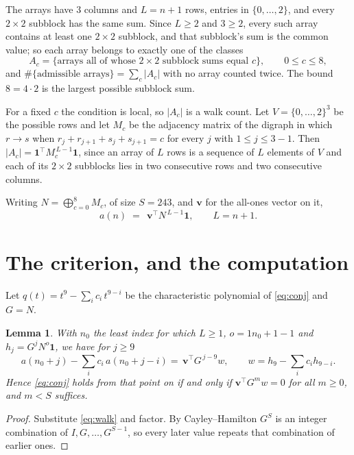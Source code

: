 \documentclass[11pt,a4paper]{article}
\theoremstyle{plain}
\newtheorem{lemma}[theorem]{Lemma}
\theoremstyle{definition}
\begin{document}
The arrays have $3$ columns and $L=n+1$ rows, entries in
$\{0,\dots,2\}$, and every $2\times2$ subblock has the same sum. Since $L\ge2$ and
$3\ge2$, every such array contains at least one $2\times2$ subblock, and that subblock's
sum is the common value; so each array belongs to exactly one of the classes
\[
A_c=\{\text{arrays all of whose }2\times2\text{ subblock sums equal }c\},
\qquad 0\le c\le 8,
\]
and $\#\{\text{admissible arrays}\}=\sum_c |A_c|$ with no array counted twice. The bound
$8=4\cdot2$ is the largest possible subblock sum.

For a fixed $c$ the condition is local, so $|A_c|$ is a walk count. Let
$V=\{0,\dots,2\}^{3}$ be the possible rows and let $M_c$ be the adjacency
matrix of the digraph in which $r\to s$ when
$r_j+r_{j+1}+s_j+s_{j+1}=c$ for every $j$ with $1\le j\le 3-1$. Then
$|A_c|=\mathbf{1}^{\!\top}M_c^{\,L-1}\mathbf{1}$, since an array of $L$ rows is a
sequence of $L$ elements of $V$ and each of its $2\times2$ subblocks lies in two consecutive
rows and two consecutive columns.

Writing $N=\bigoplus_{c=0}^{8}M_c$, of size $S=243$, and $\mathbf{v}$ for the
all-ones vector on it,
\begin{equation}\label{eq:walk}
a(n)\;=\;\,\mathbf{v}^{\!\top}N^{\,L-1}\mathbf{1},\qquad L=n+1.
\end{equation}

\section{The criterion, and the computation}

Let $q(t)=t^{9}-\sum_i c_i\,t^{9-i}$ be the characteristic polynomial of
\eqref{eq:conj} and $G=N$.

\begin{lemma}\label{lem:crit}
With $n_0$ the least index for which $L\ge1$, $o=1n_0+1-1$ and
$h_j=G^{j}N^{o}\mathbf{1}$, we have for $j\ge9$
\[
a(n_0+j)-\sum_i c_i\,a(n_0+j-i)=\,\mathbf{v}^{\!\top}G^{\,j-9}w,
\qquad w=h_{9}-\sum_i c_ih_{9-i} .
\]
Hence \eqref{eq:conj} holds from that point on if and only if
$\mathbf{v}^{\!\top}G^{m}w=0$ for all $m\ge0$, and $m<S$ suffices.
\end{lemma}

\begin{proof}
Substitute \eqref{eq:walk} and factor. By Cayley--Hamilton $G^{S}$ is an integer
combination of $I,G,\dots,G^{S-1}$, so every later value repeats that combination of
earlier ones.
\end{proof}
\end{document}
